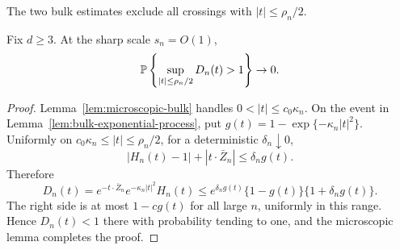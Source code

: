 The two bulk estimates exclude all crossings with \(|t|\le\rho_n/2\).
\begin{proposition}
\label{prop:bulk-mgf-exclusion}
Fix \(d\ge3\). At the sharp scale \(s_n=O(1)\),
\[
    \mathbb P\left\{\sup_{|t|\le\rho_n/2}D_n(t)>1\right\}\to0 .
\]
\end{proposition}

\begin{proof}
Lemma~\ref{lem:microscopic-bulk} handles \(0<|t|\le c_0\kappa_n\).
On the event in Lemma~\ref{lem:bulk-exponential-process}, put
\(g(t)=1-\exp\{-\kappa_n|t|^2\}\).  Uniformly on
\(c_0\kappa_n\le |t|\le\rho_n/2\), for a deterministic \(\delta_n\downarrow0\),
\[
    |H_n(t)-1|+|t\cdot\bar Z_n|\le\delta_n g(t).
\]
Therefore
\[
    D_n(t)
    =
    e^{-t\cdot\bar Z_n}e^{-\kappa_n|t|^2}H_n(t)
    \le
    e^{\delta_ng(t)}\{1-g(t)\}\{1+\delta_ng(t)\}.
\]
The right side is at most \(1-cg(t)\) for all large \(n\), uniformly in
this range.  Hence \(D_n(t)<1\) there with probability tending to one,
and the microscopic lemma completes the proof.
\end{proof}
